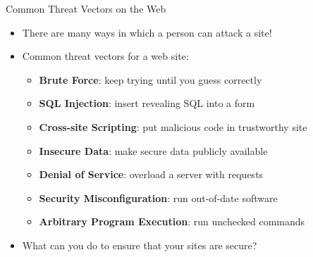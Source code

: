 \documentclass[14pt,aspectratio=169]{beamer}
\begin{document}
%
\begin{frame}{Common Threat Vectors on the Web}
  \begin{itemize}
    \item There are many ways in which a person can attack a site!
      \vspace*{-.15in}
    \item Common threat vectors for a web site:
      \begin{itemize}
        \item {\bf Brute Force}: keep trying until you guess correctly
        \item {\bf SQL Injection}: insert revealing SQL into a form
        \item {\bf Cross-site Scripting}: put malicious code in trustworthy
          site
        \item {\bf Insecure Data}: make secure data publicly available
        \item {\bf Denial of Service}: overload a server with requests
        \item {\bf Security Misconfiguration}: run out-of-date software
        \item {\bf Arbitrary Program Execution}: run unchecked commands
      \end{itemize}
      \vspace*{-.25in}
    \item What can you do to ensure that your sites are secure?
  \end{itemize}
\end{frame}
\end{document}
